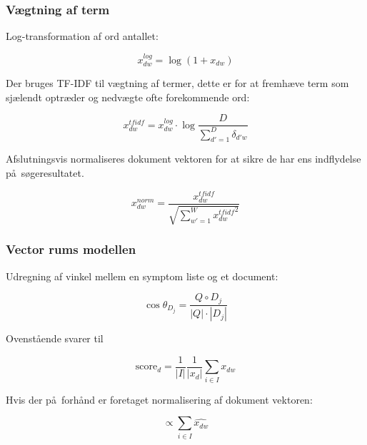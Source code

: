 \documentclass[xcolor=table]{beamer}
\begin{document}
\begin{frame}

  \frametitle{V\ae gtning af term}

  Log-transformation af ord antallet:

  \[
  x_{dw}^{log} = \log{(1 + x_{dw})}
  \]

  Der bruges TF-IDF til v\ae gtning af termer, dette er for at fremh\ae ve term som sj\ae lendt optr\ae der og nedv\ae gte ofte forekommende ord:

  \[
  x_{dw}^{tfidf} = x_{dw}^{log} \cdot \log{\frac{D}{\sum_{d\prime = 1}^{D}\delta_{d\prime w}}}
  \]

  Afslutningsvis normaliseres dokument vektoren for at sikre de har ens indflydelse p\aa\ s\o geresultatet.

  \[
  x_{dw}^{norm} = \frac{x_{dw}^{tfidf}}{\sqrt{\sum_{w\prime = 1}^{W} {x_{dw}^{tfidf}}^{2}}}
  \]

\end{frame}

\begin{frame}

  \frametitle{Vector rums modellen}

  Udregning af vinkel mellem en symptom liste og et document:
  
  \[
  \cos \theta_{D_j} = \frac{Q \circ D_j}{|Q| \cdot |D_j|}
  \]
  
  Ovenst\aa ende svarer til
  
  \[
  \textrm{score}_{d} = \frac{1}{|I|}\frac{1}{|x_{d}|} \sum_{i \in I} x_{dw}
  \]
  
  Hvis der p\aa\ forh\aa nd er foretaget normalisering af dokument vektoren:
  
  \[
  \propto  \sum_{i \in I} \widehat{x_{dw}}
  \]
  
\end{frame}
\end{document}
